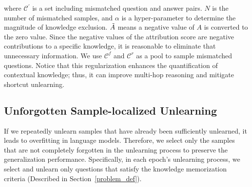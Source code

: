 \noindent where $\mathcal{C}^{'}$ is a set including mismatched question and answer pairs. $N$ is the number of mismatched samples, and $\alpha$ is a hyper-parameter to determine the magnitude of knowledge exclusion. $\Tilde{A}$ means a negative value of $A$ is converted to the zero value.
Since the negative values of the attribution score are negative contributions to a specific knowledge, it is reasonable to eliminate that unnecessary information.
We use $\mathcal{C}^{f}$ and $\mathcal{C}^{r}$ as a pool to sample mismatched questions.
Notice that this regularization enhances the quantification of contextual knowledge; thus, it can improve multi-hop reasoning and mitigate shortcut unlearning.




\subsection{Unforgotten Sample-localized Unlearning}
If we repeatedly unlearn samples that have already been sufficiently unlearned, it leads to overfitting in language models.
Therefore, we select only the samples that are not completely forgotten in the unlearning process to preserve the generalization performance.
Specifically, in each epoch’s unlearning process, we select and unlearn only questions that satisfy the knowledge memorization criteria (Described in Section~\ref{problem_def}).




